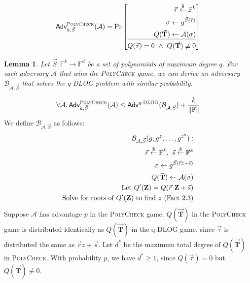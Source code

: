\documentclass{article}
\newtheorem{lemma}{Lemma}
\theoremstyle{definition}
\theoremstyle{remark}
\newcommand{\F}{\mathbb{F}}
\newcommand{\Adv}{\mathcal{A}}
\newcommand{\samples}{\overset{\$}{\leftarrow}}
\begin{document}
\[
\textsf{Adv}^{\textsc{PolyCheck}}_{k,\vec{S}}(\Adv) =
  \Pr \left[
    \begin{aligned}
    \vec{\tau} \samples \F^k \\
        \sigma \leftarrow g^{\vec{S}(\vec{\tau})} \\ 
    Q(\vec{\mathbf{T}}) \leftarrow \Adv(\sigma) \\
    \hline ~\\[-13pt]
    Q(\vec{\tau}) = 0 ~\land~
    Q(\vec{\mathbf{T}}) \not\equiv 0
    \end{aligned}
  \right]
  \]
 


\begin{lemma}
Let $\vec{S} : \F^k \rightarrow \F^d$ be a set of polynomials of maximum degree $q$.
For each adversary $\Adv$ that wins the \textsc{PolyCheck} game, we can derive an adversary $\mathcal{B}_{\Adv,\vec{S}}$ that solves the q-\textsc{DLOG} problem with similar probability.
\end{lemma}
\[
  \forall \Adv,  \textsf{Adv}^{\textsc{PolyCheck}}_{k,\vec{S}}(\Adv) \le 
  \textsf{Adv}^{q\textsc{-DLOG}}(\mathcal{B}_{\Adv,\vec{S}})  
      + \frac{k}{\| \F  \|}
  \]
\proof
We define $\mathcal{B}_{\mathcal{\Adv},\vec{S}}$ as follows:
\[
\begin{aligned}
\mathcal{B}_{\Adv,\vec{S}}(g, g^z, \ldots, g^{z^q}): & \\
    \vec{r} \samples \F^k, ~
    \vec{s} \samples \F^k \\
    \sigma \leftarrow g^{\vec{S}(\vec{r}{z} + \vec{s})} \\ 
    Q(\vec{\mathbf{T}}) \leftarrow \Adv(\sigma) \\
    \textnormal{Let~} Q'(\mathbf{Z}) = Q(\vec{r}~\mathbf{Z} + \vec{s}) \\
    \textnormal{Solve for roots of $Q'(\mathbf{Z})$ to find $z$ (Fact~2.3)}
\end{aligned}
\]
Suppose $\Adv$ has advantage $p$ in the \textsc{PolyCheck} game.
$Q(\vec{\mathbf{T}})$ in the \textsc{PolyCheck} game is distributed identically as $Q(\vec{\mathbf{T}})$ in the q-\textsc{DLOG} game, since $\vec{\tau}$ is distributed the same as $\vec{r} z + \vec{s}$.
Let $d^*$ be the maximum total degree of $Q(\mathbf{\vec{T}})$ in \textsc{PolyCheck}. 
With probability $p$, we have $d^* \ge 1$, since $Q(\vec{\tau})=0$ but $Q(\vec{\mathbf{T}}) \not\equiv 0$.
\end{document}
